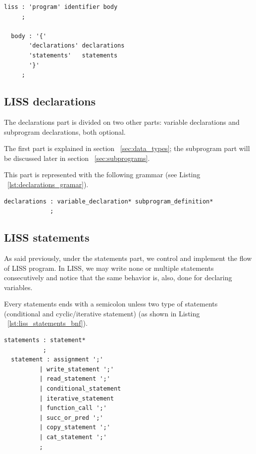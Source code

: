 \documentclass[
  oneside,
  11pt, a4paper,
  footinclude=true,
  headinclude=true,
  cleardoublepage=empty
]{scrbook}
\begin{document}
\begin{lstlisting}[caption={BNF of program in LISS},label={lst:program_grammar}]
  liss : 'program' identifier body
     ;

  body : '{'
       'declarations' declarations
       'statements'   statements
       '}'
     ;
\end{lstlisting}


\subsection{LISS declarations}
The declarations part is divided on two other parts: variable declarations and subprogram declarations, both optional.

The first part is explained in section ~\ref{sec:data_types}; the subprogram part will be discussed later in section ~\ref{sec:subprograms}.

This part is represented with the following grammar (see Listing ~\ref{lst:declarations_gramar}).

\begin{lstlisting}[caption={BNF of declarations in LISS},label={lst:declarations_grammar}]
  declarations : variable_declaration* subprogram_definition*
             ;
\end{lstlisting}

\subsection{LISS statements}

As said previously, under the statements part, we control and implement the flow of LISS program.
In LISS, we may write none or multiple statements consecutively and notice that the same behavior is, also, done for declaring variables.

Every statements ends with a semicolon unless two type of statements (conditional and cyclic/iterative statement) (as shown in Listing ~\ref{lst:liss_statements_bnf}).

\begin{lstlisting}[caption={BNF of statements in LISS},label={lst:liss_statements_bnf}]
  statements : statement*
           ;
  statement : assignment ';'
          | write_statement ';'
          | read_statement ';'
          | conditional_statement
          | iterative_statement
          | function_call ';'
          | succ_or_pred ';'
          | copy_statement ';'
          | cat_statement ';'
          ;
\end{lstlisting}
\end{document}
